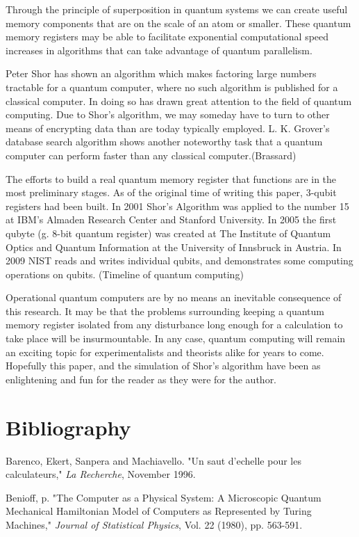 \documentclass[]{article}
\begin{document}
Through the principle of superposition in quantum systems we can
create useful memory components that are on the scale of an atom or
smaller.  These quantum memory registers may be able to facilitate
exponential computational speed increases in algorithms that can take
advantage of quantum parallelism.

Peter Shor has shown an algorithm which makes factoring large numbers
tractable for a quantum computer, where no such algorithm is published
for a classical computer. In doing so has drawn great attention to the
field of quantum computing.  Due to Shor's algorithm, we may someday
have to turn to other means of encrypting data than are today
typically employed.  L. K. Grover's database search algorithm shows
another noteworthy task that a quantum computer can perform faster
than any classical computer.(Brassard)

The efforts to build a real quantum memory register that functions are
in the most preliminary stages.  As of the original time of writing
this paper, 3-qubit registers had been built.  In 2001 Shor's
Algorithm was applied to the number 15 at IBM's Almaden Research
Center and Stanford University.  In 2005 the first qubyte (g. 8-bit
quantum register) was created at The Institute of Quantum Optics and
Quantum Information at the University of Innsbruck in Austria.  In 2009
NIST reads and writes individual qubits, and demonstrates some
computing operations on qubits. (Timeline of quantum computing)

Operational quantum computers are by no means an inevitable
consequence of this research.  It may be that the problems surrounding
keeping a quantum memory register isolated from any disturbance long
enough for a calculation to take place will be insurmountable.  In any
case, quantum computing will remain an exciting topic for
experimentalists and theorists alike for years to come.  Hopefully
this paper, and the simulation of Shor's algorithm have been as
enlightening and fun for the reader as they were for the author.

\section{Bibliography}

Barenco, Ekert, Sanpera and Machiavello. "Un saut d'echelle pour les
calculateurs," \emph{La Recherche}, November 1996.

Benioff, p. "The Computer as a Physical System: A Microscopic Quantum
Mechanical Hamiltonian Model of Computers as Represented by Turing
Machines," \emph{Journal of Statistical Physics}, Vol. 22 (1980),
pp. 563-591.
\end{document}
